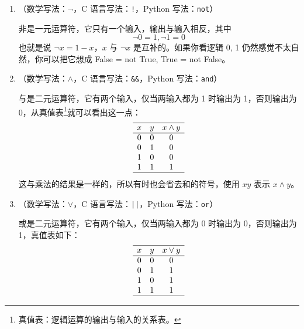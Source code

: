 \begin{enumerate}
    \item {}（数学写法：$\neg$，C 语言写法：\texttt{!}，Python 写法：\texttt{not}）

          非是一元运算符，它只有一个输入，输出与输入相反，其中
          \[
              \neg 0 = 1, \neg 1 = 0
          \]
          也就是说 $\neg x = 1 - x$，$x$ 与 $\neg x$ 是互补的。如果你看逻辑 0, 1 仍然感觉不太自然，你可以把它想成 False = not True, True = not False。

    \item {}（数学写法：$\land$，C 语言写法：\texttt{\&\&}，Python 写法：\texttt{and}）

          与是二元运算符，它有两个输入，仅当两输入都为 1 时输出为 1，否则输出为 0，从真值表\footnote{真值表：逻辑运算的输出与输入的关系表。}就可以看出这一点：
          \[
              \begin{array}{ccc}
                  \hline
                  x & y & x \land y \\
                  \hline
                  0 & 0 & 0         \\
                  0 & 1 & 0         \\
                  1 & 0 & 0         \\
                  1 & 1 & 1         \\
                  \hline
              \end{array}
          \]
          这与乘法的结果是一样的，所以有时也会省去和的符号，使用 $xy$ 表示 $x \land y$。

    \item {}（数学写法：$\lor$，C 语言写法：\texttt{||}，Python 写法：\texttt{or}）

          或是二元运算符，它有两个输入，仅当两输入都为 0 时输出为 0，否则输出为 1，真值表如下：
          \[
              \begin{array}{ccc}
                  \hline
                  x & y & x \lor y \\
                  \hline
                  0 & 0 & 0        \\
                  0 & 1 & 1        \\
                  1 & 0 & 1        \\
                  1 & 1 & 1        \\
                  \hline
              \end{array}
          \]
\end{enumerate}

